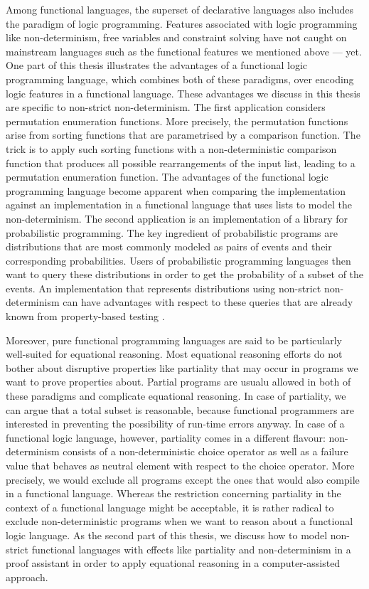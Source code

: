 Among functional languages, the superset of declarative languages also includes the paradigm of logic programming.
Features associated with logic programming like non\--determinism, free variables and constraint solving have not caught on mainstream languages such as the functional features we mentioned above --- yet.
One part of this thesis illustrates the advantages of a functional logic programming language, which combines both of these paradigms, over encoding logic features in a functional language.
These advantages we discuss in this thesis are specific to non\--strict non\--determinism.
The first application considers permutation enumeration functions.
More precisely, the permutation functions arise from sorting functions that are parametrised by a comparison function.
The trick is to apply such sorting functions with a non\--deterministic comparison function that produces all possible rearrangements of the input list, leading to a permutation enumeration function.
The advantages of the functional logic programming language become apparent when comparing the implementation against an implementation in a functional language that uses lists to model the non\--determinism.
The second application is an implementation of a library for probabilistic programming.
The key ingredient of probabilistic programs are distributions that are most commonly modeled as pairs of events and their corresponding probabilities.
Users of probabilistic programming languages then want to query these distributions in order to get the probability of a subset of the events.
An implementation that represents distributions using non\--strict non\--determinism can have advantages with respect to these queries that are already known from property\--based testing \citep{christiansen2008easycheck,runciman2008smallcheck}.

Moreover, pure functional programming languages are said to be particularly well\--suited for equational reasoning.
Most equational reasoning efforts do not bother about disruptive properties like partiality that may occur in programs we want to prove properties about.
Partial programs are usualu allowed in both of these paradigms and complicate equational reasoning.
In case of partiality, we can argue that a total subset is reasonable, because functional programmers are interested in preventing the possibility of run\--time errors anyway.
In case of a functional logic language, however, partiality comes in a different flavour: non\--determinism consists of a non\--deterministic choice operator as well as a failure value that behaves as neutral element with respect to the choice operator.
More precisely, we would exclude all programs except the ones that would also compile in a functional language.
Whereas the restriction concerning partiality in the context of a functional language might be acceptable, it is rather radical to exclude non\--deterministic programs when we want to reason about a functional logic language.
As the second part of this thesis, we discuss how to model non\--strict functional languages with effects like partiality and non\--determinism in a proof assistant in order to apply equational reasoning in a computer\--assisted approach.

